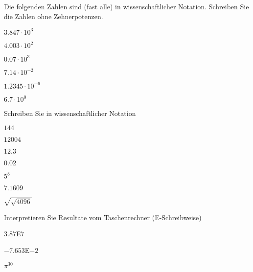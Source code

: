 \platzFuerBerechnungenBisEndeSeite{}
\TRAINER{\newpage}

Die folgenden Zahlen sind (fast alle) in wissenschaftlicher Notation. Schreiben
Sie die Zahlen ohne Zehnerpotenzen.

\begin{bbwAufgabenBlock}
\item $3.847 \cdot{} 10^3$ 
\item $4.003\cdot{} 10^2$ 
\item $0.07\cdot{}10^3$ 
\item $7.14\cdot{}10^{-2}$
\item $1.2345\cdot{}10^{-6}$ 
\item $6.7\cdot{}10^0$ 
\end{bbwAufgabenBlock}

\platzFuerBerechnungenBisEndeSeite{}


Schreiben Sie in wissenschaftlicher Notation

\begin{bbwAufgabenBlock}
\item $144$ 
\item $12004$ 
\item $12.3$ 
\item $0.02$ 
\item $5^8$ 
\item $7.1609$ 
\item $\sqrt{\sqrt{4096}}$ 
\end{bbwAufgabenBlock}

\platzFuerBerechnungenBisEndeSeite{}

Interpretieren Sie Resultate vom Taschenrechner ({\scriptsize{E}}-Schreibweise)

\begin{bbwAufgabenBlock}
\item $3.87${\scriptsize{E}}$7$ 
\item $-7.653${\scriptsize{E}}$-2$ 
\item $\pi^{30}$ 
\end{bbwAufgabenBlock}


